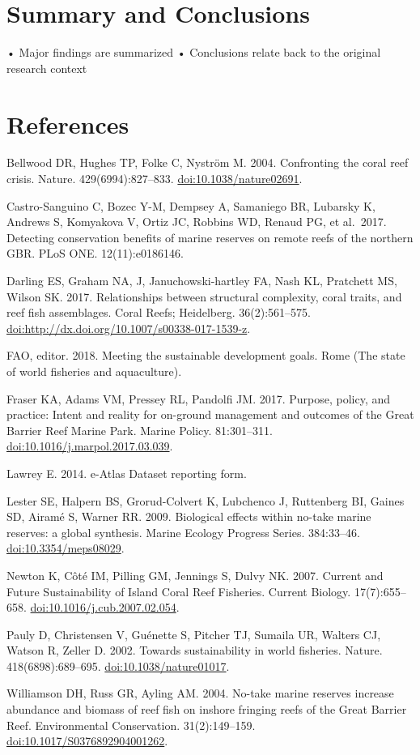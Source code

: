 \documentclass[12pt,]{article}
\begin{document}
\hypertarget{summary-and-conclusions}{%
\section{Summary and Conclusions}\label{summary-and-conclusions}}

• Major findings are summarized • Conclusions relate back to the
original research context

\newpage

\hypertarget{references}{%
\section{References}\label{references}}

Bellwood DR, Hughes TP, Folke C, Nyström M. 2004. Confronting the coral
reef crisis. Nature. 429(6994):827--833. \url{doi:10.1038/nature02691}.

Castro-Sanguino C, Bozec Y-M, Dempsey A, Samaniego BR, Lubarsky K,
Andrews S, Komyakova V, Ortiz JC, Robbins WD, Renaud PG, et al.~2017.
Detecting conservation benefits of marine reserves on remote reefs of
the northern GBR. PLoS ONE. 12(11):e0186146.

Darling ES, Graham NA, J, Januchowski-hartley FA, Nash KL, Pratchett MS,
Wilson SK. 2017. Relationships between structural complexity, coral
traits, and reef fish assemblages. Coral Reefs; Heidelberg.
36(2):561--575. \url{doi:http://dx.doi.org/10.1007/s00338-017-1539-z}.

FAO, editor. 2018. Meeting the sustainable development goals. Rome (The
state of world fisheries and aquaculture).

Fraser KA, Adams VM, Pressey RL, Pandolfi JM. 2017. Purpose, policy, and
practice: Intent and reality for on-ground management and outcomes of
the Great Barrier Reef Marine Park. Marine Policy. 81:301--311.
\url{doi:10.1016/j.marpol.2017.03.039}.

Lawrey E. 2014. e-Atlas Dataset reporting form.

Lester SE, Halpern BS, Grorud-Colvert K, Lubchenco J, Ruttenberg BI,
Gaines SD, Airamé S, Warner RR. 2009. Biological effects within no-take
marine reserves: a global synthesis. Marine Ecology Progress Series.
384:33--46. \url{doi:10.3354/meps08029}.

Newton K, Côté IM, Pilling GM, Jennings S, Dulvy NK. 2007. Current and
Future Sustainability of Island Coral Reef Fisheries. Current Biology.
17(7):655--658. \url{doi:10.1016/j.cub.2007.02.054}.

Pauly D, Christensen V, Guénette S, Pitcher TJ, Sumaila UR, Walters CJ,
Watson R, Zeller D. 2002. Towards sustainability in world fisheries.
Nature. 418(6898):689--695. \url{doi:10.1038/nature01017}.

Williamson DH, Russ GR, Ayling AM. 2004. No-take marine reserves
increase abundance and biomass of reef fish on inshore fringing reefs of
the Great Barrier Reef. Environmental Conservation. 31(2):149--159.
\url{doi:10.1017/S0376892904001262}.
\end{document}

